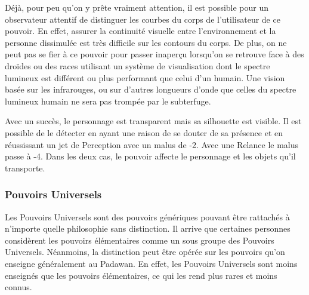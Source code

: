 \begin{description}[align=left]
        Déjà, pour peu qu’on y prête vraiment attention, il est possible pour un observateur attentif de distinguer les courbes du corps de l’utilisateur de ce pouvoir. En effet, assurer la continuité visuelle entre l’environnement et la personne dissimulée est très difficile sur les contours du corps. De plus, on ne peut pas se fier à ce pouvoir pour passer inaperçu lorsqu’on se retrouve face à des droïdes ou des races utilisant un système de visualisation dont le spectre lumineux est différent ou plus performant que celui d’un humain. Une vision basée sur les infrarouges, ou sur d’autres longueurs d’onde que celles du spectre lumineux humain ne sera pas trompée par le subterfuge.

        Avec un succès, le personnage est transparent mais sa silhouette est visible. Il est possible de le détecter en ayant une raison de se douter de sa présence et en réussissant un jet de Perception avec un malus de -2. Avec une Relance le malus passe à -4. Dans les deux cas, le pouvoir affecte le personnage et les objets qu’il transporte.
        \\

\end{description}

\subsubsection{Pouvoirs Universels}

Les Pouvoirs Universels sont des pouvoirs génériques pouvant être rattachés à n’importe quelle philosophie sans distinction. Il arrive que certaines personnes considèrent les pouvoirs élémentaires comme un sous groupe des Pouvoirs Universels. Néanmoins, la distinction peut être opérée sur les pouvoirs qu’on enseigne généralement au Padawan. En effet, les Pouvoirs Universels sont moins enseignés que les pouvoirs élémentaires, ce qui les rend plus rares et moins connus. 

